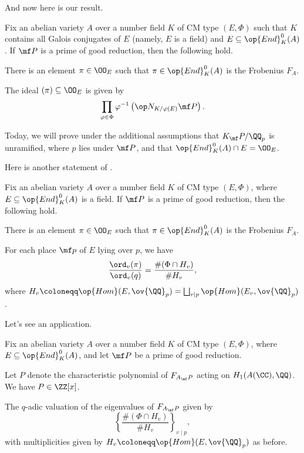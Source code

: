 \documentclass[../notes.tex]{subfiles}
\begin{document}
And now here is our result.
\begin{theorem} \label{thm:st}
	Fix an abelian variety $A$ over a number field $K$ of CM type $(E,\Phi)$ such that $K$ contains all Galois conjugates of $E$ (namely, $E$ is a field) and $E\subseteq\op{End}^0_K(A)$. If $\mf P$ is a prime of good reduction, then the following hold.
	\begin{listalph}
		\item There is an element $\pi\in\OO_E$ such that $\pi\in\op{End}^0_K(A)$ is the Frobenius $F_A$.
		\item The ideal $(\pi)\subseteq\OO_E$ is given by
		\[\prod_{\varphi\in\Phi}\varphi^{-1}\left(\op N_{K/\varphi(E)}\mf P\right).\]
	\end{listalph}
\end{theorem}
\begin{warn}
	Today, we will prove  under the additional assumptions that $K_\mf P/\QQ_p$ is unramified, where $p$ lies under $\mf P$, and that $\op{End}^0_K(A)\cap E=\OO_E$.
\end{warn}
Here is another statement of .
\begin{theorem} \label{thm:st-2}
	Fix an abelian variety $A$ over a number field $K$ of CM type $(E,\Phi)$, where $E\subseteq\op{End}^0_K(A)$ is a field. If $\mf P$ is a prime of good reduction, then the following hold.
	\begin{listalph}
		\item There is an element $\pi\in\OO_E$ such that $\pi\in\op{End}^0_K(A)$ is the Frobenius $F_A$.
		\item For each place $\mf p$ of $E$ lying over $p$, we have
		\[\frac{\ord_v(\pi)}{\ord_v(q)}=\frac{\#(\Phi\cap H_v)}{\#H_v},\]
		where $H_v\coloneqq\op{Hom}(E,\ov{\QQ}_p)=\bigsqcup_{v\mid p}\op{Hom}(E_v,\ov{\QQ}_p)$.
	\end{listalph}
\end{theorem}
Let's see an application.
\begin{corollary}
	Fix an abelian variety $A$ over a number field $K$ of CM type $(E,\Phi)$, where $E\subseteq\op{End}^0_K(A)$, and let $\mf P$ be a prime of good reduction.
	\begin{listalph}
		\item Let $P$ denote the characteristic polynomial of $F_{A_\mf P}$ acting on $H_1(A(\CC),\QQ)$. We have $P\in\ZZ[x]$.
		\item The $q$-adic valuation of the eigenvalues of $F_{A_\mf P}$ given by
		\[\left\{\frac{\#(\Phi\cap H_v)}{\#H_v}\right\}_{v\mid p},\]
		with multiplicities given by $H_v\coloneqq\op{Hom}(E,\ov{\QQ}_p)$ as before.
	\end{listalph}
\end{corollary}
\end{document}

